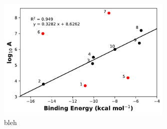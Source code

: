 % 

\begin{figure}[htb]
  \centering
  \includegraphics[width=0.75\textwidth]{figures/arrhenius-scatter.pdf}
  \caption[bleh]{bleh}
\label{fig:Arrhenius}
\end{figure}
